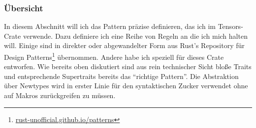 \documentclass[12pt]{article}
\begin{document}
\subsubsection{Übersicht}
In diesem Abschnitt will ich das Pattern präzise definieren, das ich im Tensors-Crate verwende. Dazu definiere ich eine Reihe von Regeln an die ich mich halten will. Einige sind in direkter oder abgewandelter Form aus Rust's Repository für Design Patterns\footnote{\href{https://rust-unofficial.github.io/patterns}{rust-unofficial.github.io/patterns}} übernommen. Andere habe ich speziell für dieses Crate entworfen. Wie bereits oben diskutiert sind aus rein technischer Sicht bloße Traits und entsprechende Supertraits bereits das ``richtige Pattern''. Die Abstraktion über Newtypes wird in erster Linie für den syntaktischen Zucker verwendet ohne auf Makros zurückgreifen zu müssen.
\end{document}
